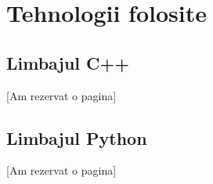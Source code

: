 \chapter{Tehnologii folosite}

\section{Limbajul C++}
[Am rezervat o pagina]
\pagebreak




\section{Limbajul Python}
[Am rezervat o pagina]
\pagebreak








